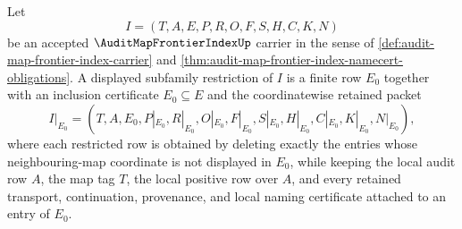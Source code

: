 \begin{definition}
\label{def:audit-map-frontier-index-displayed-restriction}
Let
$$
I=(T,A,E,P,R,O,F,S,H,C,K,N)
$$
be an accepted $\AuditMapFrontierIndexUp$ carrier in the sense of \autoref{def:audit-map-frontier-index-carrier} and \autoref{thm:audit-map-frontier-index-namecert-obligations}. A displayed subfamily restriction of $I$ is a finite row $E_0$ together with an inclusion certificate $E_0\subseteq E$ and the coordinatewise retained packet
$$
I|_{E_0}=(T,A,E_0,P|_{E_0},R|_{E_0},O|_{E_0},F|_{E_0},S|_{E_0},H|_{E_0},C|_{E_0},K|_{E_0},N|_{E_0}),
$$
where each restricted row is obtained by deleting exactly the entries whose neighbouring-map coordinate is not displayed in $E_0$, while keeping the local audit row $A$, the map tag $T$, the local positive row over $A$, and every retained transport, continuation, provenance, and local naming certificate attached to an entry of $E_0$.
\end{definition}

